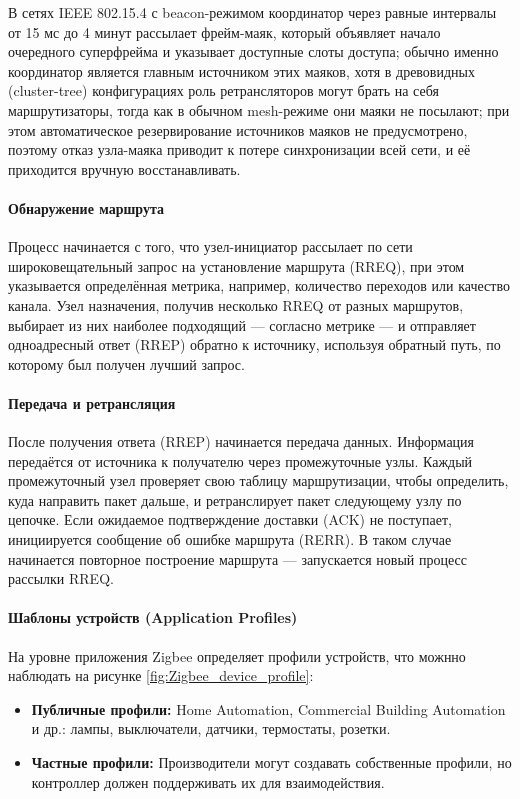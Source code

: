 \documentclass[a4paper,12pt]{article}
\begin{document}
В сетях IEEE 802.15.4 с beacon-режимом координатор через равные интервалы от 15 мс до 4 минут рассылает фрейм-маяк, который объявляет начало очередного суперфрейма и указывает доступные слоты доступа\cite{IEEE802_15_4_2020}; обычно именно координатор является главным источником этих маяков, хотя в древовидных (cluster-tree) конфигурациях роль ретрансляторов могут брать на себя маршрутизаторы, тогда как в обычном mesh-режиме они маяки не посылают; при этом автоматическое резервирование источников маяков не предусмотрено, поэтому отказ узла-маяка приводит к потере синхронизации всей сети, и её приходится вручную восстанавливать.


\paragraph{Обнаружение маршрута} Процесс начинается с того, что узел-инициатор рассылает по сети широковещательный запрос на установление маршрута (RREQ), при этом указывается определённая метрика, например, количество переходов или качество канала.
Узел назначения, получив несколько RREQ от разных маршрутов, выбирает из них наиболее подходящий — согласно метрике — и отправляет одноадресный ответ (RREP) обратно к источнику, используя обратный путь, по которому был получен лучший запрос.

\paragraph{Передача и ретрансляция} После получения ответа (RREP) начинается передача данных. Информация передаётся от источника к получателю через промежуточные узлы. Каждый промежуточный узел проверяет свою таблицу маршрутизации, чтобы определить, куда направить пакет дальше, и ретранслирует пакет следующему узлу по цепочке.
Если ожидаемое подтверждение доставки (ACK) не поступает, инициируется сообщение об ошибке маршрута (RERR). В таком случае начинается повторное построение маршрута — запускается новый процесс рассылки RREQ.


\paragraph{Шаблоны устройств (Application Profiles)}
На уровне приложения Zigbee определяет профили устройств, что можнно наблюдать на рисунке \ref{fig:Zigbee_device_profile}:
\begin{itemize}
 \item \textbf{Публичные профили:} Home Automation, Commercial Building Automation и др.: лампы, выключатели, датчики, термостаты, розетки.
 \item \textbf{Частные профили:} Производители могут создавать собственные профили, но контроллер должен поддерживать их для взаимодействия.
\end{itemize}
\end{document}

